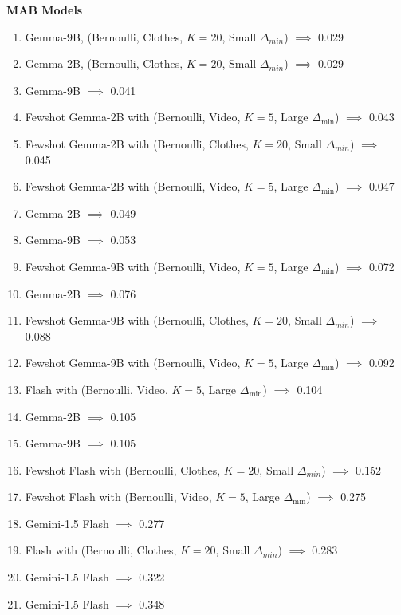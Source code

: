 \textbf{MAB Models}
\begin{enumerate}
    \item \FSD Gemma-9B, (Bernoulli, Clothes, $K=20$, Small $\Delta_{min}$) $\implies$ \RH \hfill 0.029
    \item \FSD Gemma-2B, (Bernoulli, Clothes, $K=20$, Small $\Delta_{min}$) $\implies$ \RH \hfill 0.029
    \item Gemma-9B $\implies$ \AG \hfill 0.041
    \item Fewshot Gemma-2B with (Bernoulli, Video, $K=5$, Large $\Delta_{\min}$) $\implies$ \SH \hfill 0.043
    \item Fewshot Gemma-2B with  (Bernoulli, Clothes, $K=20$, Small $\Delta_{min}$) $\implies$ \SH \hfill 0.045
    \item Fewshot Gemma-2B with (Bernoulli, Video, $K=5$, Large $\Delta_{\min}$) $\implies$ \RH \hfill 0.047
    \item Gemma-2B $\implies$ \AG \hfill 0.049
    \item Gemma-9B $\implies$ \SH \hfill 0.053
    \item Fewshot Gemma-9B with (Bernoulli, Video, $K=5$, Large $\Delta_{\min}$) $\implies$ \RH \hfill 0.072
    \item Gemma-2B $\implies$ \RH \hfill 0.076
    \item Fewshot Gemma-9B with  (Bernoulli, Clothes, $K=20$, Small $\Delta_{min}$) $\implies$ \SH \hfill 0.088
    \item Fewshot Gemma-9B with (Bernoulli, Video, $K=5$, Large $\Delta_{\min}$) $\implies$ \SH \hfill 0.092
    \item \OFT Flash with (Bernoulli, Video, $K=5$, Large $\Delta_{\min}$) \AG $\implies$ \AG \hfill 0.104
    \item Gemma-2B $\implies$ \SH \hfill 0.105
    \item Gemma-9B $\implies$ \RH \hfill 0.105
    \item Fewshot Flash with  (Bernoulli, Clothes, $K=20$, Small $\Delta_{min}$) $\implies$ \RH \hfill 0.152
    \item Fewshot Flash with (Bernoulli, Video, $K=5$, Large $\Delta_{\min}$) $\implies$ \RH \hfill 0.275
    \item Gemini-1.5 Flash $\implies$ \RH \hfill 0.277
    \item \OFT Flash with  (Bernoulli, Clothes, $K=20$, Small $\Delta_{min}$) \AG $\implies$ \AG \hfill 0.283
    \item Gemini-1.5 Flash $\implies$ \AG \hfill 0.322
    \item Gemini-1.5 Flash $\implies$ \SH \hfill 0.348

\end{enumerate}
